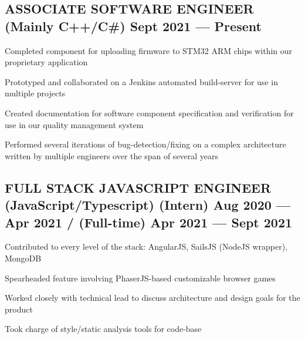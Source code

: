 \documentclass[letter,10pt]{article}
\begin{document}
\subsection{{ASSOCIATE SOFTWARE ENGINEER (Mainly C++/C\#) \texorpdfstring{\hfill}{\space} Sept 2021 --- Present}}
\begin{zitemize}
\item Completed component for uploading firmware to STM32 ARM chips within our proprietary application
\item Prototyped and collaborated on a Jenkins automated build-server for use in multiple projects
\item Created documentation for software component specification and verification for use in our quality management system
\item Performed several iterations of bug-detection/fixing on a complex architecture written by multiple engineers over the span of several years
\end{zitemize}

\subsection{{FULL STACK JAVASCRIPT ENGINEER (JavaScript/Typescript) \texorpdfstring{\hfill}{\space} (Intern) Aug 2020 --- Apr 2021 / (Full-time) Apr 2021 --- Sept 2021}}
\begin{zitemize}
\item Contributed to every level of the stack: AngularJS, SailsJS (NodeJS wrapper), MongoDB
\item Spearheaded feature involving PhaserJS-based customizable browser games
\item Worked closely with technical lead to discuss architecture and design goals for the product
\item Took charge of style/static analysis tools for code-base
\end{zitemize}

\end{document}
